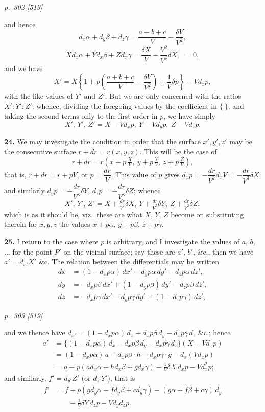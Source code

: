 \documentclass[11pt,a4paper]{article}
\theoremstyle{plain}
\begin{document}
\bigskip
\textit{p.~302 [519]}
\smallskip

\noindent and hence
\[
d_x\alpha + d_y\beta + d_z\gamma = \frac{a + b + c}{V} - \frac{\delta V}{V^2},
\]
\[
X d_x\alpha + Y d_x\beta + Z d_x\gamma = \frac{\delta X}{V} - \frac{V^2}{V^3}\delta X,\ =\ 0,
\]
and we have
\[
X' = X\left\{ 1 + p\left( \frac{a + b + c}{V} - \frac{\delta V}{V^2} \right) + \frac{1}{V}\delta p \right\} - V d_x p,
\]
with the like values of $Y'$ and $Z'$.  But we are only concerned with the ratios
$X' : Y' : Z'$; whence, dividing the foregoing values by the coefficient in $\{\ \}$, and
taking the second terms only to the first order in $p$, we have simply
\[
X',\, Y',\, Z' = X - V d_x p,\ Y - V d_y p,\ Z - V d_z p.
\]

\textbf{24.} We may investigate the condition in order that the surface $x', y', z'$ may be
the consecutive surface $r + dr = r(x, y, z)$.  This will be the case of
\[
r + dr = r\!\left(x + p\,\tfrac{X}{V},\ y + p\,\tfrac{Y}{V},\ z + p\,\tfrac{Z}{V}\right),
\]
that is, $r + dr = r + pV$, or $p = \dfrac{dr}{V}$.  This value of $p$ gives $d_x p = -\dfrac{dr}{V^2} d_x V = -\dfrac{dr}{V^3}\delta X$, and
similarly $d_y p = -\dfrac{dr}{V^3}\delta Y$, $d_z p = -\dfrac{dr}{V^3}\delta Z$; whence
\[
X',\, Y',\, Z' = X + \tfrac{dr}{V^2}\delta X,\ Y + \tfrac{dr}{V^2}\delta Y,\ Z + \tfrac{dr}{V^2}\delta Z,
\]
which is as it should be, viz.\ these are what $X$, $Y$, $Z$ become on substituting therein
for $x, y, z$ the values $x + p\alpha$, $y + p\beta$, $z + p\gamma$.

\textbf{25.} I return to the case where $p$ is arbitrary, and I investigate the values of
$a$, $b$, $\ldots$ for the point $P'$ on the vicinal surface; say these are $a'$, $b'$, \&c., then we
have $a' = d_{x'} X'$ \&c.  The relation between the differentials may be written
\begin{align*}
dx &= (1 - d_x p\alpha)\,dx' - d_y p\alpha\,dy' - d_z p\alpha\,dz', \\
dy &= -d_x p\beta\,dx' + (1 - d_y p\beta)\,dy' - d_z p\beta\,dz', \\
dz &= -d_x p\gamma\,dx' - d_y p\gamma\,dy' + (1 - d_z p\gamma)\,dz',
\end{align*}

\bigskip
\textit{p.~303 [519]}
\smallskip

\noindent and we thence have $d_{x'} = (1 - d_x p\alpha)\,d_x - d_x p\beta\,d_y - d_x p\gamma\,d_z$ \&c.; hence
\begin{align*}
a' &= \{(1 - d_x p\alpha)\,d_x - d_x p\beta\,d_y - d_x p\gamma\,d_z\}(X - V d_x p) \\
&= (1 - d_x p\alpha)\,a - d_x p\beta \cdot h - d_x p\gamma \cdot g - d_x(V d_x p) \\
&= a - p\left( a d_x\alpha + h d_x\beta + g d_x\gamma \right) - \tfrac{1}{V} \delta X\, d_x p - V d_x^2 p;
\end{align*}
and similarly, $f' = d_{y'} Z'$ (or $d_{z'} Y'$), that is
\begin{align*}
f' &= f - p\left( g d_y\alpha + f d_y\beta + c d_y\gamma \right) - (g\alpha + f\beta + c\gamma)\,d_y \\
&\phantom{= f} - \tfrac{1}{V} \delta Y\, d_z p - V d_y d_z p.
\end{align*}
\end{document}
